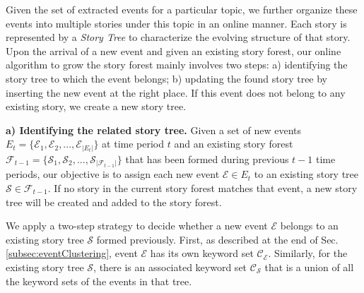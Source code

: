 

Given the set of extracted events for a particular topic, we further organize these events into multiple stories under this topic in an online manner. Each story is represented by a \textit{Story Tree} to characterize the evolving structure of that story.
Upon the arrival of a new event and given an existing story forest, our online algorithm to grow the story forest mainly involves two steps: a) identifying the story tree to which the event belongs; b) updating the found story tree by inserting the new event at the right place. 
If this event does not belong to any existing story, we create a new story tree.


{\bf a) Identifying the related story tree.} 
Given a set of new events $E_t = \{\mathcal{E}_1, \mathcal{E}_2, ..., \mathcal{E}_{|E_t|}\}$ at time period $t$ and an existing story forest $\mathcal{F}_{t-1} = \{ \mathcal{S}_1, \mathcal{S}_2, ..., \mathcal{S}_{|\mathcal{F}_{t-1}|}\}$ that has been formed during previous $t-1$ time periods, our objective is to assign each new event $\mathcal{E} \in E_t$ to an existing story tree $\mathcal{S} \in \mathcal{F}_{t-1}$. If no story in the current story forest matches that event, a new story tree will be created and added to the story forest. %

We apply a two-step strategy to decide whether a new event $\mathcal{E}$ belongs to an existing story tree $\mathcal{S}$ formed previously.
First, as described at the end of Sec. \ref{subsec:eventClustering}, event $\mathcal{E}$ has its own keyword set $\mathcal{C}_{\mathcal{E}}$.
Similarly, for the existing story tree $\mathcal{S}$, there is an associated keyword set $\mathcal{C}_{\mathcal{S}}$ that is a union of all the keyword sets of the events in that tree.

